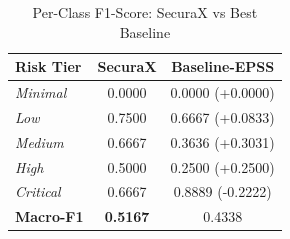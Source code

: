 \begin{table}[htbp]
\centering
\caption{Per-Class F1-Score: SecuraX vs Best Baseline}
\label{tab:per_class_f1}
\begin{tabular}{lcc}
\hline
\textbf{Risk Tier} & \textbf{SecuraX} & \textbf{Baseline-EPSS} \\
\hline
\textit{Minimal} & 0.0000 & 0.0000 (+0.0000) \\
\textit{Low} & 0.7500 & 0.6667 (+0.0833) \\
\textit{Medium} & 0.6667 & 0.3636 (+0.3031) \\
\textit{High} & 0.5000 & 0.2500 (+0.2500) \\
\textit{Critical} & 0.6667 & 0.8889 (-0.2222) \\
\hline
\textbf{Macro-F1} & \textbf{0.5167} & 0.4338 \\
\hline
\end{tabular}
\end{table}